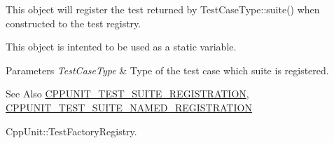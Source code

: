 This object will register the test returned by Test\-Case\-Type\-::suite() when constructed to the test registry.

This object is intented to be used as a static variable.


\begin{DoxyParams}{Parameters}
{\em Test\-Case\-Type} & Type of the test case which suite is registered. \\
\hline
\end{DoxyParams}
\begin{DoxySeeAlso}{See Also}
\hyperlink{group__inf2990_ga78226027bf3abc2f171af0825474f707}{C\-P\-P\-U\-N\-I\-T\-\_\-\-T\-E\-S\-T\-\_\-\-S\-U\-I\-T\-E\-\_\-\-R\-E\-G\-I\-S\-T\-R\-A\-T\-I\-O\-N}, \hyperlink{_helper_macros_8h_a028a5855a40ad3836e2a26aa48cd4c91}{C\-P\-P\-U\-N\-I\-T\-\_\-\-T\-E\-S\-T\-\_\-\-S\-U\-I\-T\-E\-\_\-\-N\-A\-M\-E\-D\-\_\-\-R\-E\-G\-I\-S\-T\-R\-A\-T\-I\-O\-N} 

Cpp\-Unit\-::\-Test\-Factory\-Registry. 
\end{DoxySeeAlso}



